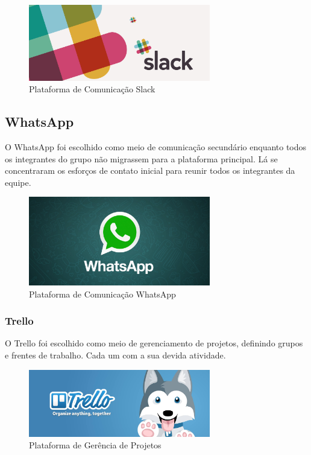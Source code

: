 \begin{figure}[h]
  \centering
  \includegraphics[width=300px, scale=0.5]{figuras/slack}
  \caption{Plataforma de Comunicação Slack}
  \label{table:slack}
\end{figure}


\subsection{WhatsApp}
O WhatsApp foi escolhido como meio de comunicação secundário enquanto todos os integrantes do grupo
não migrassem para a plataforma principal. Lá se concentraram os esforços de contato inicial para reunir
todos os integrantes da equipe.

\begin{figure}[h]
  \centering
  \includegraphics[width=300px, scale=0.5]{figuras/wpp}
  \caption{Plataforma de Comunicação WhatsApp}
  \label{table:wpp}
\end{figure}


\subsubsection{Trello}
O Trello foi escolhido como meio de gerenciamento de projetos, definindo grupos e
frentes de trabalho. Cada um com a sua devida atividade.

\begin{figure}[h]
  \centering
  \includegraphics[width=300px, scale=0.5]{figuras/trello1}
  \caption{Plataforma de Gerência de Projetos}
  \label{table:trello1}
\end{figure}


